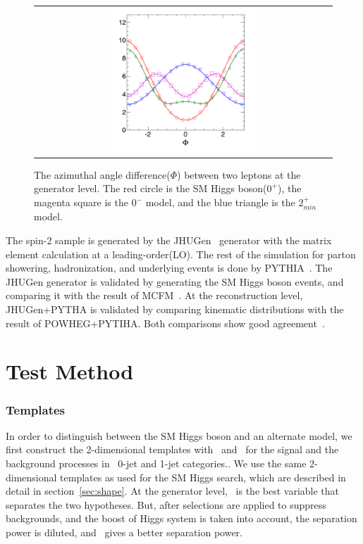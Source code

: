 \begin{figure}[htp] 
\centering 
\begin{tabular}{c} 
\includegraphics[width=0.5\textwidth]{figures/SpinPaper.pdf} 
\end{tabular} 
\caption{The azimuthal angle difference($\Phi$) between
two leptons at the generator level. The red circle is the SM Higgs boson($0^+$),
the magenta square is the $0^-$ model, and the blue triangle is the $2_{min}^+$ model.} 
\label{fig:spinpaper} 
\end{figure} 

The spin-2 sample is generated by the JHUGen~\cite{Bolognesi:2012mm,Gao:2010qx} generator 
with the matrix element calculation at a leading-order(LO). 
The rest of the simulation for parton showering, hadronization, and underlying events 
is done by PYTHIA~\cite{Sjostrand:2006za}. The JHUGen generator is validated 
by generating the SM Higgs boson events, and comparing it with the result 
of MCFM~\cite{Campbell:2010ff}. 
At the reconstruction level, JHUGen+PYTHA is validated by comparing kinematic 
distributions with the result of POWHEG+PYTIHA.
Both comparisons show good agreement~\cite{GaoAN}. 

\section{Test Method}

\subsubsection{Templates}

In order to distinguish between the SM Higgs boson and an alternate model,
we first construct the 2-dimensional templates with \mT\ and \mll\ for the signal 
and the background processes in \DF\ 0-jet and 1-jet categories..
We use the same 2-dimensional templates 
as used for the SM Higgs search, which are described in detail in 
section~\ref{sec:shape}. At the generator level, 
\delphill\ is the best variable that separates the two hypotheses. 
But, after selections are applied to suppress backgrounds, and the boost of Higgs system 
is taken into account, the separation power is diluted, and \mll\ gives a better 
separation power. 

